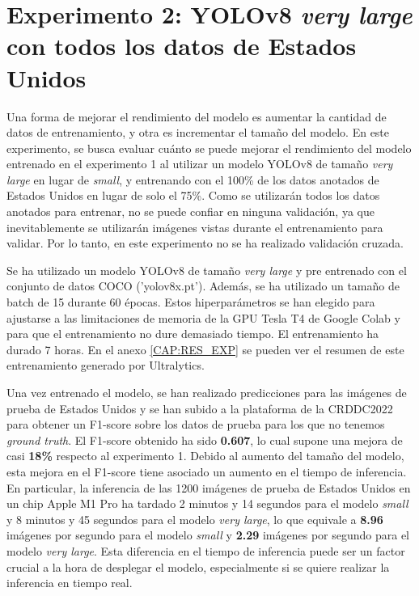\section{Experimento 2: YOLOv8 \textit{very large} con todos los datos de Estados Unidos}\label{SEC:EXP2}

Una forma de mejorar el rendimiento del modelo es aumentar la cantidad de datos de entrenamiento, y otra es incrementar el tamaño del modelo. En este experimento, se busca evaluar cuánto se puede mejorar el rendimiento del modelo entrenado en el experimento 1 al utilizar un modelo YOLOv8 de tamaño \textit{very large} en lugar de \textit{small}, y entrenando con el 100\% de los datos anotados de Estados Unidos en lugar de solo el 75\%. Como se utilizarán todos los datos anotados para entrenar, no se puede confiar en ninguna validación, ya que inevitablemente se utilizarán imágenes vistas durante el entrenamiento para validar. Por lo tanto, en este experimento no se ha realizado validación cruzada.

Se ha utilizado un modelo YOLOv8 de tamaño \textit{very large} y pre entrenado con el conjunto de datos COCO ('yolov8x.pt'). Además, se ha utilizado un tamaño de batch de 15 durante 60 épocas. Estos hiperparámetros se han elegido para ajustarse a las limitaciones de memoria de la GPU Tesla T4 de Google Colab y para que el entrenamiento no dure demasiado tiempo. El entrenamiento ha durado 7 horas. En el anexo \ref{CAP:RES_EXP} se pueden ver el resumen de este entrenamiento generado por Ultralytics.

Una vez entrenado el modelo, se han realizado predicciones para las imágenes de prueba de Estados Unidos y se han subido a la plataforma de la CRDDC2022 para obtener un F1-score sobre los datos de prueba para los que no tenemos \textit{ground truth}. El F1-score obtenido ha sido \textbf{0.607}, lo cual supone una mejora de casi \textbf{18\%} respecto al experimento 1. Debido al aumento del tamaño del modelo, esta mejora en el F1-score tiene asociado un aumento en el tiempo de inferencia. En particular, la inferencia de las 1200 imágenes de prueba de Estados Unidos en un chip Apple M1 Pro ha tardado 2 minutos y 14 segundos para el modelo \textit{small} y 8 minutos y 45 segundos para el modelo \textit{very large}, lo que equivale a \textbf{8.96} imágenes por segundo para el modelo \textit{small} y \textbf{2.29} imágenes por segundo para el modelo \textit{very large}. Esta diferencia en el tiempo de inferencia puede ser un factor crucial a la hora de desplegar el modelo, especialmente si se quiere realizar la inferencia en tiempo real.

